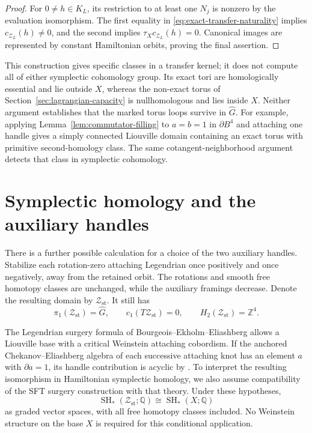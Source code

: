 \documentclass[11pt]{amsart}
\theoremstyle{definition}
\theoremstyle{remark}
\newcommand{\Z}{\mathbb Z}
\newcommand{\Q}{\mathbb Q}
\begin{document}
\begin{proof}
For $0\ne h\in K_L$, its restriction to at least one $N_j$ is
nonzero by the evaluation isomorphism. The first equality in
\eqref{eq:exact-transfer-naturality} implies
$c_{\mathcal Z_L}(h)\ne0$, and the second implies
$\tau_Xc_{\mathcal Z_L}(h)=0$. Canonical images are represented
by constant Hamiltonian orbits, proving the final assertion.
\end{proof}

This construction gives specific classes in a transfer kernel;
it does not compute all of either symplectic cohomology group.
Its exact tori are homologically essential and lie outside $X$,
whereas the non-exact torus of Section~\ref{sec:lagrangian-capacity}
is nullhomologous and lies inside $X$.
Neither argument establishes that the marked torus loops survive
in $\widehat G$. For example, applying
Lemma~\ref{lem:commutator-filling} to $a=b=1$ in $\partial B^4$
and attaching one handle gives a simply connected Liouville
domain containing an exact torus with primitive second-homology
class. The same cotangent-neighborhood argument detects that
class in symplectic cohomology.

\section{Symplectic homology and the auxiliary handles}
\label{sec:handle-homology}

There is a further possible calculation for a choice of the two
auxiliary handles. Stabilize each rotation-zero attaching Legendrian
once positively and once negatively, away from the retained orbit.
The rotations and smooth free homotopy classes are unchanged, while
the auxiliary framings decrease. Denote the resulting domain by
$\mathcal Z_{\mathrm{st}}$. It still has
\[
 \pi_1(\mathcal Z_{\mathrm{st}})=\widehat G,\qquad
 c_1(T\mathcal Z_{\mathrm{st}})=0,
 \qquad H_2(\mathcal Z_{\mathrm{st}})=\Z^4.
\]

The Legendrian surgery formula of Bourgeois--Ekholm--Eliashberg
\cite[Section 5, Theorem 5.6]{BEE12} allows a Liouville base with
a critical Weinstein attaching cobordism. If the anchored
Chekanov--Eliashberg algebra of each successive attaching knot has
an element $a$ with $\partial a=1$, its handle contribution is
acyclic by \cite[Section 7.2]{BEE12}. To interpret the resulting
isomorphism in Hamiltonian symplectic homology, we also assume
compatibility of the SFT surgery construction with that theory.
Under these hypotheses,
\begin{equation}\label{eq:conditional-sh}
 \operatorname{SH}_*(\mathcal Z_{\mathrm{st}};\Q)
                 \cong\operatorname{SH}_*(X;\Q)
\end{equation}
as graded vector spaces, with all free homotopy classes included.
No Weinstein structure on the base $X$ is required for this
conditional application.
\end{document}
